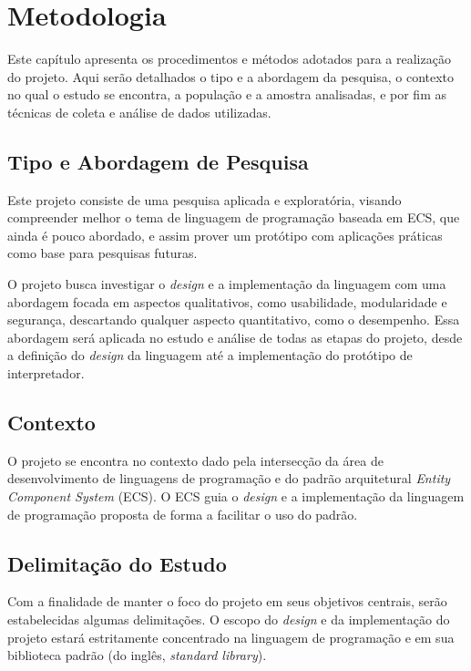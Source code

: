 \chapter{Metodologia}\label{ch:metodologia}

Este capítulo apresenta os procedimentos e métodos adotados para a realização do projeto. Aqui serão detalhados o tipo e a abordagem da pesquisa, o contexto no qual o estudo se encontra, a população e a amostra analisadas, e por fim as técnicas de coleta e análise de dados utilizadas.

\section{Tipo e Abordagem de Pesquisa}

Este projeto consiste de uma pesquisa aplicada e exploratória, visando compreender melhor o tema de linguagem de programação baseada em ECS, que ainda é pouco abordado, e assim prover um protótipo com aplicações práticas como base para pesquisas futuras.

O projeto busca investigar o \textit{design} e a implementação da linguagem com uma abordagem focada em aspectos qualitativos, como usabilidade, modularidade e segurança, descartando qualquer aspecto quantitativo, como o desempenho. Essa abordagem será aplicada no estudo e análise de todas as etapas do projeto, desde a definição do \textit{design} da linguagem até a implementação do protótipo de interpretador.

\section{Contexto}

O projeto se encontra no contexto dado pela intersecção da área de desenvolvimento de linguagens de programação e do padrão arquitetural \textit{Entity Component System} (ECS). O ECS guia o \textit{design} e a implementação da linguagem de programação proposta de forma a facilitar o uso do padrão.

\section{Delimitação do Estudo}

Com a finalidade de manter o foco do projeto em seus objetivos centrais, serão estabelecidas algumas delimitações. O escopo do \textit{design} e da implementação do projeto estará estritamente concentrado na linguagem de programação e em sua biblioteca padrão (do inglês, \textit{standard library}).

